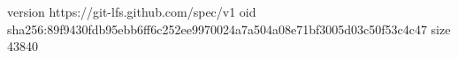 version https://git-lfs.github.com/spec/v1
oid sha256:89f9430fdb95ebb6ff6c252ee9970024a7a504a08e71bf3005d03c50f53c4c47
size 43840
